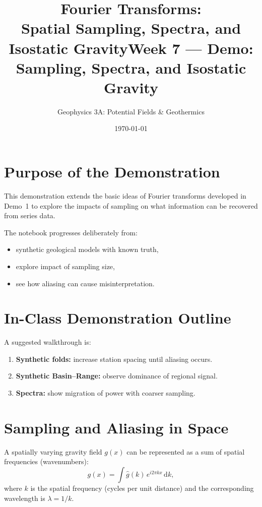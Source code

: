 \documentclass[11pt,a4paper]{article}
\title{Fourier Transforms:\\
Spatial Sampling, Spectra, and Isostatic Gravity}
\title{Week 7 --- Demo: Sampling, Spectra, and Isostatic Gravity}
\author{Geophysics 3A: Potential Fields \& Geothermics}
\date{\today}
\begin{document}
\maketitle

\section{Purpose of the Demonstration}

This demonstration extends the basic ideas of Fourier transforms developed in Demo~1 to explore the impacts of sampling on what information can be recovered from series data.

The notebook progresses deliberately from:
\begin{itemize}
  \item synthetic geological models with known truth,
  \item explore impact of sampling size,
  \item see how aliasing can cause misinterpretation.
\end{itemize}

\section{In-Class Demonstration Outline}

A suggested walkthrough is:

\begin{enumerate}
  \item \textbf{Synthetic folds:} increase station spacing until aliasing occurs.
  \item \textbf{Synthetic Basin--Range:} observe dominance of regional signal.
  \item \textbf{Spectra:} show migration of power with coarser sampling.
\end{enumerate}


\section{Sampling and Aliasing in Space}

A spatially varying gravity field $g(x)$ can be represented as a sum of spatial
frequencies (wavenumbers):
\begin{equation}
g(x) = \int \hat{g}(k)\, e^{i 2\pi k x}\, \mathrm{d}k ,
\end{equation}
where $k$ is the spatial frequency (cycles per unit distance) and
the corresponding wavelength is $\lambda = 1/k$.
\end{document}
